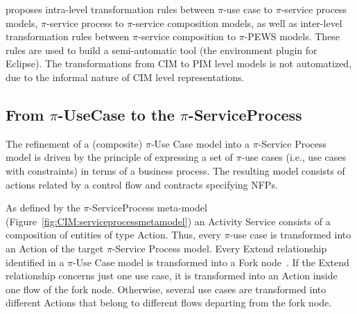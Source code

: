 


\pisodm  proposes intra-level transformation rules between $\pi$-use case to $\pi$-service process models, $\pi$-service process to $\pi$-service composition  models, as well as inter-level transformation rules between $\pi$-service composition to $\pi$-PEWS models. 
These rules are used to build a semi-automatic tool (the \pisodm environment plugin for Eclipse).
The transformations from CIM to PIM level models is not automatized, due to the informal nature of CIM level representations.
 
\subsection{From $\pi$-UseCase to the $\pi$-ServiceProcess}

The refinement of a (composite) $\pi$-Use Case model into a $\pi$-Service Process model is driven by the principle of expressing a set of $\pi$-use cases (i.e., use cases with constraints)   in terms of  a business process.
The resulting model consists of actions related by a control flow and contracts specifying NFPs. 

As defined by the $\pi$-ServiceProcess  meta-model (Figure~\ref{fig:CIM:serviceprocessmetamodel}) an {\sc Activity Service} consists of a composition of  entities of type {\sc Action}. 
Thus, every {\sf $\pi$-use case} is transformed into an {\sf Action} of the target $\pi$-Service Process model.  
Every {\sf Extend} relationship identified in a $\pi$-Use Case model is
transformed into a  {\sf Fork node}~\cite{valeriaThesis,placidoPhDThesis2012}.
If the {\sf Extend} relationship concerns just one {\sf use case}, it is transformed into an {\sf Action} inside one flow of the fork node. 
Otherwise, several  {\sf use cases} are transformed into different {\sf Actions} that belong to different flows departing from the fork node.   

